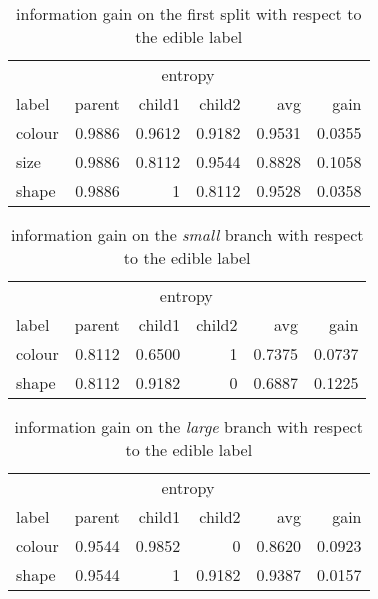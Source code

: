 \documentclass[11pt]{article}
\begin{document}
\begin{table}[h]\footnotesize
\label{tab:gain}
\begin{tabular}{ l r r r r r }
& \multicolumn{4}{c}{entropy} & \\
\cline{2-5}
label & parent & child1 & child2 & avg & gain \\
\hline
colour & 0.9886 & 0.9612 & 0.9182 & 0.9531 & 0.0355 \\
size & 0.9886 & 0.8112 & 0.9544 & 0.8828 & 0.1058 \\
shape & 0.9886 & 1 & 0.8112 & 0.9528 & 0.0358 \\
\end{tabular}
\caption{information gain on the first split with respect to the edible label}
\end{table}



\begin{table}[h]\footnotesize
\label{tab:gain-small}
\begin{tabular}{ l r r r r r }
& \multicolumn{4}{c}{entropy} & \\
\cline{2-5}
label & parent & child1 & child2 & avg & gain \\
\hline
colour & 0.8112 & 0.6500 & 1 & 0.7375 & 0.0737 \\
shape & 0.8112 & 0.9182 & 0 & 0.6887 & 0.1225 \\
\end{tabular}
\caption{information gain on the \emph{small} branch with respect to the edible label}
\end{table}

\begin{table}[h]\footnotesize
\label{tab:gain-large}
\begin{tabular}{ l r r r r r }
& \multicolumn{4}{c}{entropy} & \\
\cline{2-5}
label & parent & child1 & child2 & avg & gain \\
\hline
colour & 0.9544 & 0.9852 & 0 & 0.8620 & 0.0923 \\
shape & 0.9544 & 1 & 0.9182 & 0.9387 & 0.0157 \\
\end{tabular}
\caption{information gain on the \emph{large} branch with respect to the edible label}
\end{table}
\end{document}

